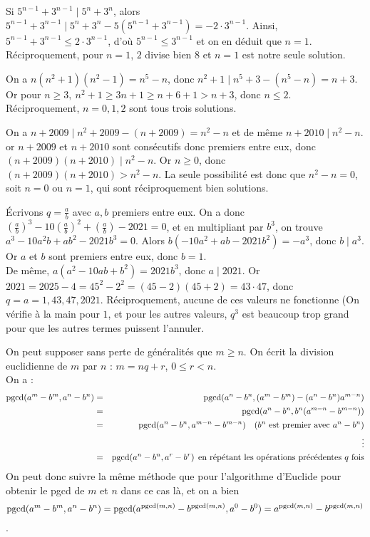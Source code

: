 \begin{sol}
Si $5^{n-1}+3^{n-1}\mid 5^n+3^n$, alors $5^{n-1}+3^{n-1}\mid 5^n+3^n-5(5^{n-1}+3^{n-1})=-2\cdot 3^{n-1}$. Ainsi, $5^{n-1}+3^{n-1}\le 2\cdot 3^{n-1}$, d'où $5^{n-1}\le 3^{n-1}$ et on en déduit que $n=1$. Réciproquement, pour $n=1$, $2$ divise bien $8$ et $n=1$ est notre seule solution.
\end{sol}
\begin{sol}
On a $n(n^2+1)(n^2-1)=n^5-n$, donc $n^2+1\mid n^5+3-(n^5-n)=n+3$. Or pour $n\ge 3,\:n^2+1\ge 3n+1\ge n+6+1>n+3$, donc $n\le 2$. Réciproquement, $n=0,1,2$ sont tous trois solutions.
\end{sol}
\begin{sol}
On a $n+2009\mid n^2+2009-(n+2009)=n^2-n$ et de même $n+2010\mid n^2-n$. or $n+2009$ et $n+2010$ sont consécutifs donc premiers entre eux, donc $(n+2009)(n+2010)\mid n^2-n$. Or $n\ge 0$, donc $(n+2009)(n+2010)> n^2-n$. La seule possibilité est donc que $n^2-n=0$, soit $n=0$ ou $n=1$, qui sont réciproquement bien solutions.
\end{sol}
\begin{sol}
Écrivons $q=\frac ab$ avec $a,b$ premiers entre eux. On a donc $(\frac ab)^3-10(\frac ab)^2+(\frac ab)-2021=0$, et en multipliant par $b^3$, on trouve $a^3-10a^2b+ab^2-2021b^3=0$. Alors $b(-10a^2+ab-2021b^2)=-a^3$, donc $b\mid a^3$. Or $a$ et $b$ sont premiers entre eux, donc $b=1$.\\
De même, $a(a^2-10ab+b^2)=2021b^3$, donc $a\mid 2021$. Or $2021=2025-4=45^2-2^2=(45-2)(45+2)=43\cdot 47$, donc $q=a=1,43,47,2021$. Réciproquement, aucune de ces valeurs ne fonctionne (On vérifie à la main pour $1$, et pour les autres valeurs, $q^3$ est beaucoup trop grand pour que les autres termes puissent l'annuler.
\end{sol}
\begin{sol}
On peut supposer sans perte de généralités que $m\ge n$. On écrit la division euclidienne de $m$ par $n$ : $m=nq+r$, $0\le r<n$. \\
On a :
\begin{eqnarray*}
\operatorname{\mathrm{pgcd}}(a^m-b^m,a^n-b^n)
&=&\operatorname{\mathrm{pgcd}}(a^n-b^n,(a^m-b^m)-(a^n-b^n)a^{m-n})\\
&=&\operatorname{\mathrm{pgcd}}(a^n-b^n,b^n(a^{m-n}-b^{m-n}))\\
&=&\operatorname{\mathrm{pgcd}}(a^n-b^n,a^{m-n}-b^{m-n})\quad\text{($b^n$ est premier avec $a^n-b^n$)}\\
&&\quad \vdots\\
&=&\operatorname{\mathrm{pgcd}}(a^n -b^n,a^r -b^r) \:\:\text{en répétant les opérations précédentes $q$ fois}
\end{eqnarray*}
On peut donc suivre la même méthode que pour l'algorithme d'Euclide pour obtenir le pgcd de $m$ et $n$ dans ce cas là, et on a bien $$\operatorname{\mathrm{pgcd}}(a^m-b^m,a^n-b^n)=\operatorname{\mathrm{pgcd}}(a^{\operatorname{\mathrm{pgcd}}(m,n)}-b^{\operatorname{\mathrm{pgcd}}(m,n)},a^0-b^0)=a^{\operatorname{\mathrm{pgcd}}(m,n)}-b^{\operatorname{\mathrm{pgcd}}(m,n)}$$.
\end{sol}
